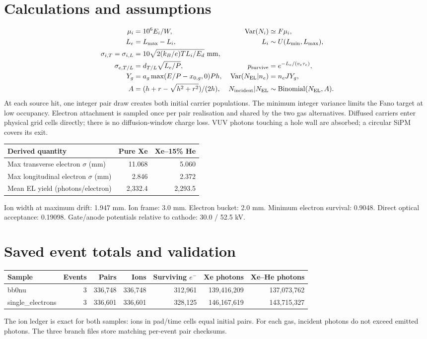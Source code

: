 \documentclass[11pt]{article}
\begin{document}
\section*{Calculations and assumptions}
\begin{align*}
\mu_i &= 10^6 E_i/W, &\operatorname{Var}(N_i)&\simeq F\mu_i,\\
L_e &= L_{\max}-L_i, & L_i&\sim U(L_{\min},L_{\max}),\\
\sigma_{i,T}=\sigma_{i,L}&=10\sqrt{2(k_B/e)TL_i/E_d}\ {\rm mm},\\
\sigma_{e,T/L}&=d_{T/L}\sqrt{L_e/P}, &p_{\rm survive}&=e^{-L_e/(v_e\tau_e)},\\
Y_g&=a_g\max(E/P-x_{0,g},0)Ph, &\operatorname{Var}(N_{\rm EL}|n_e)&=n_e JY_g,\\
A&=(h+r-\sqrt{h^2+r^2})/(2h), &N_{\rm incident}|N_{\rm EL}&\sim\mathrm{Binomial}(N_{\rm EL},A).
\end{align*}
At each source hit, one integer pair draw creates both initial carrier populations. The minimum integer variance limits the Fano target at low occupancy. Electron attachment is sampled once per pair realisation and shared by the two gas alternatives. Diffused carriers enter physical grid cells directly; there is no diffusion-window charge loss. VUV photons touching a hole wall are absorbed; a circular SiPM covers its exit.
\par\medskip
\begin{tabular}{lrr}\toprule Derived quantity & Pure Xe & Xe--15\% He\\\midrule
Max transverse electron $\sigma$ (mm) & 11.068 & 5.060\\
Max longitudinal electron $\sigma$ (mm) & 2.846 & 2.372\\
Mean EL yield (photons/electron) & 2,332.4 & 2,293.5\\
\bottomrule\end{tabular}
\par Ion width at maximum drift: 1.947 mm. Ion frame: 3.0 mm. Electron bucket: 2.0 mm. Minimum electron survival: 0.9048. Direct optical acceptance: 0.19098. Gate/anode potentials relative to cathode: 30.0 / 52.5 kV.
\section*{Saved event totals and validation}
\begin{tabular}{lrrrrrr}\toprule Sample & Events & Pairs & Ions & Surviving $e^-$ & Xe photons & Xe--He photons\\\midrule
bb0nu & 3 & 336,748 & 336,748 & 312,961 & 139,416,209 & 137,073,762\\
single\_electrons & 3 & 336,601 & 336,601 & 328,125 & 146,167,619 & 143,715,327\\
\bottomrule\end{tabular}
\par The ion ledger is exact for both samples: ions in pad/time cells equal initial pairs. For each gas, incident photons do not exceed emitted photons. The three branch files store matching per-event pair checksums.
\end{document}
